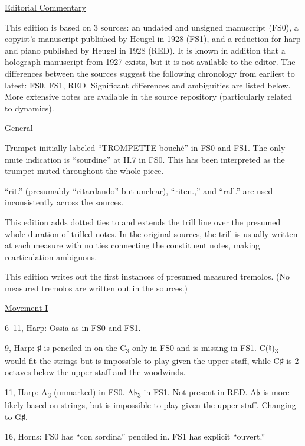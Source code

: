 \documentclass[twoside]{article}
\begin{document}
\begin{center}
\underline{\huge{Editorial Commentary}}
\end{center}

This edition is based on 3 sources: an undated and unsigned manuscript (FS0), a copyist's manuscript published by Heugel in 1928 (FS1), and a reduction for harp and piano published by Heugel in 1928 (RED). It is known in addition that a holograph manuscript from 1927 exists, but it is not available to the editor. The differences between the sources suggest the following chronology from earliest to latest: FS0, FS1, RED. Significant differences and ambiguities are listed below. More extensive notes are available in the source repository (particularly related to dynamics).

\begin{hangparas}{15pt}{1}
\begin{multicols}{2}

\underline{General}

Trumpet initially labeled ``TROMPETTE bouché'' in FS0 and FS1. The only mute indication is ``sourdine'' at II.7 in FS0. This has been interpreted as the trumpet muted throughout the whole piece.

``rit.'' (presumably ``ritardando'' but unclear), ``riten.,'' and ``rall.'' are used inconsistently across the sources.

This edition adds dotted ties to and extends the trill line over the presumed whole duration of trilled notes. In the original sources, the trill is usually written at each measure with no ties connecting the constituent notes, making rearticulation ambiguous.

This edition writes out the first instances of presumed measured tremolos. (No measured tremolos are written out in the sources.)

\underline{Movement I}

6--11, Harp: Ossia as in FS0 and FS1.

9, Harp: ♯ is penciled in on the C\textsubscript{3} only in FS0 and is missing in FS1. C(♮)\textsubscript{3} would fit the strings but is impossible to play given the upper staff, while C♯ is 2 octaves below the upper staff and the woodwinds.

11, Harp: A\textsubscript{3} (unmarked) in FS0. A♭\textsubscript{3} in FS1. Not present in RED. A♭ is more likely based on strings, but is impossible to play given the upper staff. Changing to G♯.

16, Horns: FS0 has ``con sordina'' penciled in. FS1 has explicit ``ouvert.''


\end{multicols}
\end{hangparas}
\end{document}
